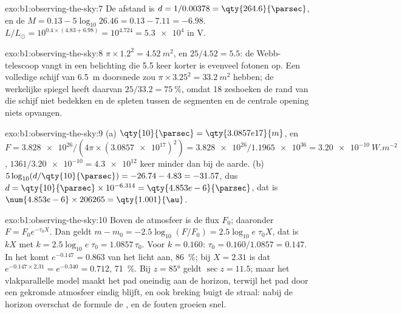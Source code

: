 \begin{solution}{exo:b1:observing-the-sky:7}
De afstand is $d = 1/0.00378 = \qty{264.6}{\parsec}$, en de 
$M = 0.13 - 5\log_{10}26.46 = 0.13 - 7.11 = -6.98$. $L/L_\odot = 10^{0.4\times(4.83 + 6.98)} =
10^{4.724} = \num{5.3e4}$ in V.
\end{solution}

\begin{solution}{exo:b1:observing-the-sky:8}
$\pi\times1.2^2 = \qty{4.52}{m^2}$, en $25/4.52 = 5.5$: de Webb-telescoop vangt in een
belichting die 5.5 keer korter is evenveel fotonen op. Een volledige schijf van
\qty{6.5}{m} doorsnede zou $\pi\times3.25^2 = \qty{33.2}{m^2}$ hebben; de werkelijke
spiegel heeft daarvan $25/33.2 = \qty{75}{\percent}$, omdat 18 zeshoeken de rand van die
schijf niet bedekken en de spleten tussen de segmenten en de centrale opening niets
opvangen.
\end{solution}

\begin{solution}{exo:b1:observing-the-sky:9}
(a) $\qty{10}{\parsec} = \qty{3.0857e17}{m}$, en $F = \num{3.828e26}/(4\pi
\times(\num{3.0857e17})^2) = \num{3.828e26}/\num{1.1965e36} =
\qty{3.20e-10}{W.m^{-2}}$, $1361/\num{3.20e-10} = \num{4.3e12}$ keer minder dan bij de aarde.
(b) $5\log_{10}(d/\qty{10}{\parsec}) = -26.74 - 4.83 = -31.57$, dus
$d = \qty{10}{\parsec}\times10^{-6.314} = \qty{4.853e-6}{\parsec}$, dat is
$\num{4.853e-6}\times206265 = \qty{1.001}{\au}$.
\end{solution}

\begin{solution}{exo:b1:observing-the-sky:10}
Boven de atmosfeer is de flux $F_0$; daaronder $F = F_0e^{-\tau_0X}$. Dan geldt
$m - m_0 = -2.5\log_{10}(F/F_0) = 2.5\log_{10}e\;\tau_0X$, dat is $kX$ met
$k = 2.5\log_{10}e\;\tau_0 = 1.0857\,\tau_0$. Voor $k = 0.160$:
$\tau_0 = 0.160/1.0857 = 0.147$. In het  komt $e^{-0.147} = 0.863$ van het licht aan,
\qty{86}{\percent}; bij $X = 2.31$ is dat $e^{-0.147\times2.31} =
e^{-0.340} = 0.712$, \qty{71}{\percent}. Bij $z = \ang{85}$ geldt $\sec z =
11.5$; maar het vlakparallelle model maakt het pad oneindig aan de horizon, terwijl het pad
door een gekromde atmosfeer eindig blijft, en ook breking buigt de straal: nabij de horizon
overschat de formule de , en de fouten groeien snel.
\end{solution}


